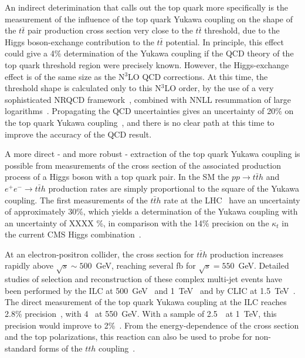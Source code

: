 An indirect deterimination that calls out the top quark more
specifically is the measurement of the influence of the top quark
Yukawa coupling on the shape of the  $t\bar{t}$ pair production 
cross section very close to the $t\bar{t}$ threshold, due to the Higgs
boson-exchange contribution to the $t\bar t$ potential. In principle,
this effect could give a 4\% determination of the Yukawa coupling if
the QCD  theory of the top quark threshold region were precisely
known.   However, the Higgs-exchange effect is of the same size as
the N$^3$LO QCD corrections.  At this time, the threshold shape is
calculated only to this N$^3$LO order, by the use of a very sophisticated
NRQCD framework~\cite{Beneke:2015kwa}, combined with NNLL resummation of
large logarithms~\cite{Hoang:2013uda}.   Propagating the QCD
uncertainties gives an uncertainty of 20\% on the top quark Yukawa
coupling~\cite{Vos:2016til}, and there is no clear path at this time to improve the
accuracy of the QCD result.

A more direct - and more robust - extraction of the top quark Yukawa coupling 
is possible from measurements of the cross section of the associated production 
process of a Higgs boson with a top quark pair. In the SM the $pp \rightarrow t\bar{t}h$ 
and $e^+e^- \rightarrow t\bar{t}h$ production rates are simply
proportional to the square of the Yukawa coupling. The first measurements of the 
$t\bar{t}h$ rate at the LHC~\cite{Sirunyan:2018hoz,Aaboud:2018urx} 
have an uncertainty of approximately 30\%, which yields a determination of the Yukawa coupling 
with an uncertainty of XXXX \%, in comparison with the 14\% precision on the $\kappa_t$ in the 
current CMS Higgs combination~\cite{Sirunyan:2018koj}.

\cite{Cepeda:2019klc}

At an electron-positron collider, the cross section for $t\bar{t}h$ production 
increases rapidly above $\sqrt{s} \sim 500 $~GeV, reaching several fb for 
$\sqrt{s} = 550$~GeV. Detailed studies of selection
 and reconstruction of these complex multi-jet events
have been performed by the ILC at 500~GeV~\cite{Yonamine:2011jg} and
 1~TeV~\cite{Behnke:2013lya,Price:2014oca} and by CLIC
at 1.5~TeV~\cite{Abramowicz:2018rjq}. The direct measurement of the
top quark Yukawa coupling at the ILC reaches 2.8\%
precision~\cite{Fujii:2015jha}, with 4~\iab{} at 550~GeV.  With a sample of
2.5~\iab\  at 1~TeV, this precision would improve to 2\%~\cite{Asner:2013psa}.  
From the energy-dependence of the cross section and the top polarizations,
this reaction can also be used to probe for non-standard forms of the
$tth$ coupling~\cite{Han:1999xd}.

